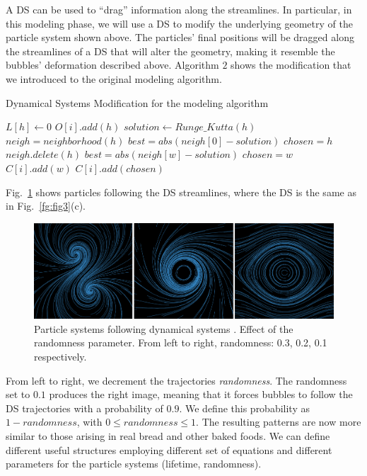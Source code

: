 A DS can be used to ``drag'' information along the streamlines. 
In particular, in this modeling phase, we will use a DS to modify the underlying geometry of the particle system shown above.
The particles' final positions will be dragged along the streamlines of a DS that will alter the geometry, making it resemble the bubbles' deformation described above.
Algorithm $2$ shows the modification that we introduced to the original modeling algorithm.

\begin{algorithm}
\caption{Dynamical Systems Modification for the modeling algorithm}
\begin{algorithmic}
\State $L[h]\gets 0$ 
\State $O[i].add(h)$
\State $solution \gets Runge\_Kutta(h)$
\State $neigh = neighborhood(h)$
\State $best = abs(neigh[0] - solution)$
\State $chosen = h$
\State $neigh.delete(h)$
        \State $best = abs(neigh[w]-solution)$
        \State $chosen = w$
    \EndIf
        \State $C[i].add(w)$
    \EndIf
\EndFor
{}
\State $C[i].add(chosen)$
\end{algorithmic}
\end{algorithm}

Fig.~\ref{fg:fig4} shows particles following the DS streamlines, where the DS is the same as in Fig.~\ref{fg:fig3}(c).

\begin{figure}
  \centerline{\includegraphics[width=13cm]{sistdin2}}
  \caption{Particle systems following dynamical systems . Effect of the randomness parameter. From left to right, randomness: 0.3, 0.2, 0.1 respectively. }
  \label{fg:fig4}
\end{figure}

From left to right, we decrement the trajectories {\em randomness}.
The randomness set to $0.1$ produces the right image, meaning that it forces bubbles to follow the DS trajectories with a probability of $0.9$.
We define this probability as $1-randomness$, with $0 \leq randomness \leq 1$.
The resulting patterns are now more similar to those arising in real bread and other baked foods.
We can define different useful structures employing different set of equations and different parameters for the particle systems (lifetime, randomness).

